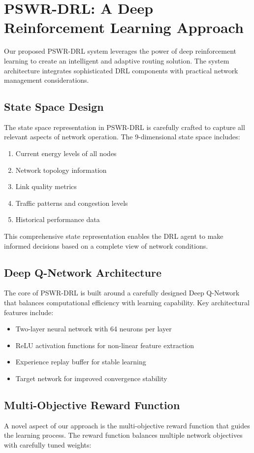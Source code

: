 \section{PSWR-DRL: A Deep Reinforcement Learning Approach}
Our proposed PSWR-DRL system leverages the power of deep reinforcement learning to create an intelligent and adaptive routing solution. The system architecture integrates sophisticated DRL components with practical network management considerations.

\subsection{State Space Design}
The state space representation in PSWR-DRL is carefully crafted to capture all relevant aspects of network operation. The 9-dimensional state space includes:

\begin{enumerate}
\item Current energy levels of all nodes
\item Network topology information
\item Link quality metrics
\item Traffic patterns and congestion levels
\item Historical performance data
\end{enumerate}

This comprehensive state representation enables the DRL agent to make informed decisions based on a complete view of network conditions.

\subsection{Deep Q-Network Architecture}
The core of PSWR-DRL is built around a carefully designed Deep Q-Network that balances computational efficiency with learning capability. Key architectural features include:

\begin{itemize}
\item Two-layer neural network with 64 neurons per layer
\item ReLU activation functions for non-linear feature extraction
\item Experience replay buffer for stable learning
\item Target network for improved convergence stability
\end{itemize}

\subsection{Multi-Objective Reward Function}
A novel aspect of our approach is the multi-objective reward function that guides the learning process. The reward function balances multiple network objectives with carefully tuned weights:

